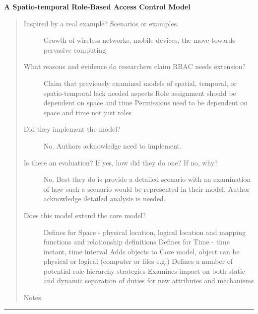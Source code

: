 \documentclass[letterpaper,10pt,english]{sphinxmanual}
\begin{document}
\textbf{A Spatio-temporal Role-Based Access Control Model}
\begin{quote}
\begin{description}
\item[{Inspired by a real example? Scenarios or examples.}] \leavevmode
Growth of wireless networks, mobile devices, the move towards pervasive computing

\item[{What reasons and evidence do researchers claim RBAC needs extension?}] \leavevmode
Claim that previously examined models of spatial, temporal, or spatio-temporal lack needed aspects
Role assignment should be dependent on space and time
Permissions need to be dependent on space and time not just roles

\item[{Did they implement the model?}] \leavevmode
No. Authors acknowledge need to implement.

\item[{Is there an evaluation? If yes, how did they do one? If no, why?}] \leavevmode
No.  Best they do is provide a detailed scenario with an examination of how such a scenario would be represented in their model. Author acknowledge detailed analysis is needed.

\item[{Does this model extend the core model?}] \leavevmode
Defines for Space - physical location, logical location and mapping functions and relationship definitions
Defines for Time - time instant, time interval
Adds objects to Core model, object can be physical or logical (computer or files e.g.)
Defines a number of potential role hierarchy strategies
Examines impact on both static and dynamic separation of duties for new attributes and mechanisms

\end{description}

Notes.
\end{quote}


\bigskip\hrule{}\bigskip
\end{document}
